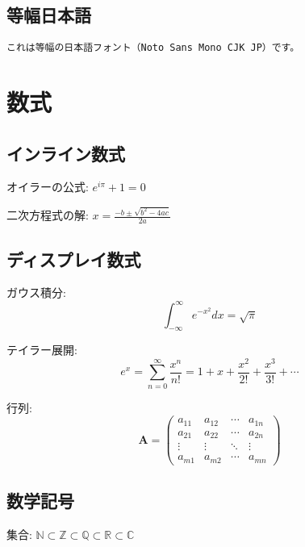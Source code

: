 \documentclass[a4paper,12pt]{ltjsarticle}
\begin{document}
\subsection{等幅日本語}

\texttt{これは等幅の日本語フォント（Noto Sans Mono CJK JP）です。}

\section{数式}

\subsection{インライン数式}

オイラーの公式: $e^{i\pi} + 1 = 0$

二次方程式の解: $x = \frac{-b \pm \sqrt{b^2 - 4ac}}{2a}$

\subsection{ディスプレイ数式}

ガウス積分:
\begin{equation}
    \int_{-\infty}^{\infty} e^{-x^2} dx = \sqrt{\pi}
\end{equation}

テイラー展開:
\begin{equation}
    e^x = \sum_{n=0}^{\infty} \frac{x^n}{n!} = 1 + x + \frac{x^2}{2!} + \frac{x^3}{3!} + \cdots
\end{equation}

行列:
\begin{equation}
    \mathbf{A} = \begin{pmatrix}
        a_{11} & a_{12} & \cdots & a_{1n} \\
        a_{21} & a_{22} & \cdots & a_{2n} \\
        \vdots & \vdots & \ddots & \vdots \\
        a_{m1} & a_{m2} & \cdots & a_{mn}
    \end{pmatrix}
\end{equation}

\subsection{数学記号}

集合: $\mathbb{N} \subset \mathbb{Z} \subset \mathbb{Q} \subset \mathbb{R} \subset \mathbb{C}$
\end{document}
